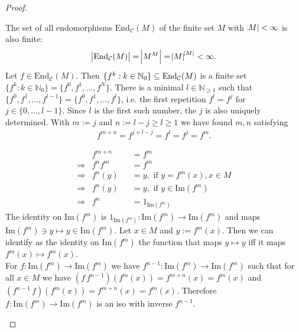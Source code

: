 \begin{proof}[Proof\nopunct]
\begin{subproof}[of (1)]
The set of all endomorphisms $\mathrm{End}_{\mathcal{C}}(M)$ of the finite set $M$ with $\abs{M} < \infty$ is also finite:
\begin{align}
\abs{\textup{End}_{\mathcal{C}}(M)} = \abs{M^{M}} = \abs{M}^{\abs{M}} < \infty.
\end{align}
Let $f \in \mathrm{End}_{\mathcal{C}}(M)$. Then $\{f^{k} : k \in \mathbb{N}_{0} \} \subseteq \textup{End}_{\mathcal{C}}(M)$ is a finite set
$\{f^{k} : k \in \mathbb{N}_{0} \} = \{f^{0},f^{1},\dots,f^{N}\}$. There is a minimal $l\in \mathbb{N}_{\geq 1}$ such that
$\{f^{0},f^{1},\dots,f^{l-1}\} = \{f^{0},f^{1},\dots,f^{l}\}$, i.e. the first repetition $f^{l} = f^{j}$ for $j \in \{0,\dots,l-1\}$. Since $l$ is the first
such number, the $j$ is also uniquely determined. With $m := j$ and $n := l-j \geq l \geq 1$ we have found $m,n$ satisfying
\begin{align}
f^{m+n} = f^{j + l-j} = f^{l} = f^{j} = f^{m}.
\end{align}
\end{subproof}
\begin{subproof}[Proof of (2).]
\begin{align*}
&f^{m+n} &&= f^{m} \\
\Rightarrow &f^{n}f^{m} &&= f^{m} \\
\Rightarrow &f^{n}(y) &&= y, \text{ if } y = f^{m}(x), x \in M \\
\Rightarrow &f^{n}(y) &&= y, \text{ if } y \in \mathrm{Im}(f^{m}) \\
\Rightarrow &f^{n} &&= 1_{\mathrm{Im}(f^{m})}
\end{align*}
The identity on $\mathrm{Im}(f^{m})$ is $1_{\mathrm{Im}(f^{m})} : \mathrm{Im}(f^{m}) \rightarrow \mathrm{Im}(f^{m})$
and maps $\mathrm{Im}(f^{m})\ni y \mapsto y \in \mathrm{Im}(f^{m})$.
Let $x \in M$ and $y := f^{m}(x)$. Then we can identify as the identity on $\mathrm{Im}(f^{m})$ the function
that maps $y \mapsto y$ iff it maps $f^{m}(x) \mapsto f^{m}(x)$.\\
For $f : \mathrm{Im}(f^{m}) \rightarrow \mathrm{Im}(f^{m})$ we have
$f^{n-1} : \mathrm{Im}(f^{m}) \rightarrow \mathrm{Im}(f^{m})$ such that for all
$x \in M$ we have $(f\,f^{n-1})(f^{m}(x)) = f^{m+n}(x) = f^{m}(x)$ and
$(f^{n-1}\,f)(f^{m}(x)) = f^{m+n}(x) = f^{m}(x)$. Therefore $f : \mathrm{Im}(f^{m}) \rightarrow \mathrm{Im}(f^{m})$
is an iso with inverse $f^{n-1}$.
\end{subproof}

\end{proof}
